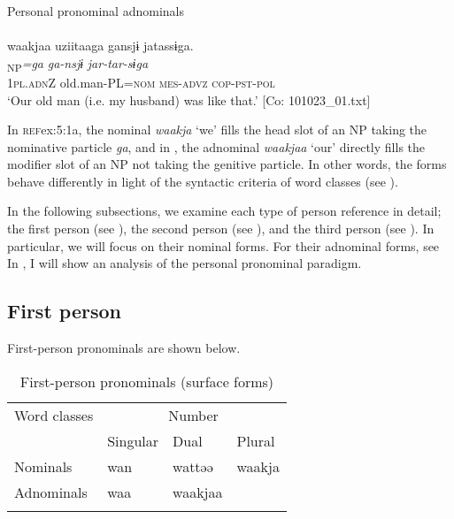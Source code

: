  \ex \label{ex:5:1b} Personal pronominal adnominals\\\\
\glll  waakjaa  uziitaaga  gansjɨ  jatassɨga.\\
[\textit{waakjaa}\textsubscript{Modifier}  \textit{uzii-taa}\textsubscript{Head}]\textsubscript{NP}\textit{=ga}  \textit{ga-nsjɨ}  \textit{jar-tar-sɨga}\\
1\textsc{pl}.\textsc{adn}Z  old.man-PL=\textsc{nom}  \textsc{mes}-\textsc{advz}  \textsc{cop}-\textsc{pst}-\textsc{pol}\\
\glt ‘Our old man (i.e. my husband) was like that.’ [Co: 101023\_01.txt]
\z
\z

In \textsc{ref}{ex:5:1a}, the nominal \textit{waakja} ‘we’ fills the head slot of an NP taking the nominative particle \textit{ga}, and in , the adnominal \textit{waakjaa} ‘our’ directly fills the modifier slot of an NP not taking the genitive particle. In other words, the forms behave differently in light of the syntactic criteria of word classes (see ).

  In the following subsections, we examine each type of person reference in detail; the first person (see ), the second person (see ), and the third person (see ). In particular, we will focus on their nominal forms. For their adnominal forms, see  In , I will show an analysis of the personal pronominal paradigm.

\subsection{First person}

First-person pronominals are shown below.

\begin{table}
\caption{\label{tab:key:33}First-person pronominals (surface forms)}
\begin{tabular}{llll}
\lsptoprule
Word classes  & \multicolumn{3}{c}{Number}\\\cmidrule(lr){2-4}
              &  Singular & Dual & Plural\\\midrule
Nominals & wan & wattəə & waakja\\
Adnominals & waa & waakjaa\\
\lspbottomrule
\end{tabular}
\end{table}

